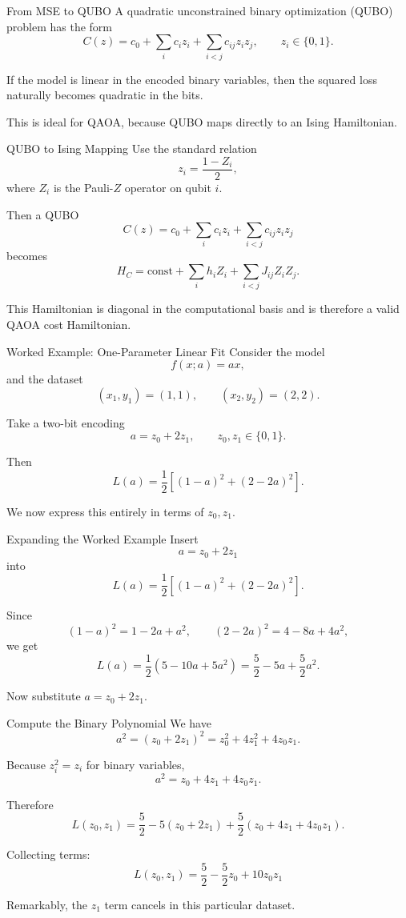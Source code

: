 \documentclass{beamer}
\begin{document}
\begin{frame}{From MSE to QUBO}
A quadratic unconstrained binary optimization (QUBO) problem has the form
\[
C(z)=c_0+\sum_i c_i z_i+\sum_{i<j} c_{ij} z_i z_j,
\qquad z_i\in\{0,1\}.
\]

If the model is linear in the encoded binary variables, then the squared loss naturally becomes quadratic in the bits.

This is ideal for QAOA, because QUBO maps directly to an Ising Hamiltonian.
\end{frame}

\begin{frame}{QUBO to Ising Mapping}
Use the standard relation
\[
z_i=\frac{1-Z_i}{2},
\]
where \(Z_i\) is the Pauli-\(Z\) operator on qubit \(i\).

Then a QUBO
\[
C(z)=c_0+\sum_i c_i z_i+\sum_{i<j} c_{ij} z_i z_j
\]
becomes
\[
H_C = \text{const} + \sum_i h_i Z_i + \sum_{i<j} J_{ij} Z_i Z_j.
\]

This Hamiltonian is diagonal in the computational basis and is therefore a valid QAOA cost Hamiltonian.
\end{frame}

\begin{frame}{Worked Example: One-Parameter Linear Fit}
Consider the model
\[
f(x;a)=ax,
\]
and the dataset
\[
(x_1,y_1)=(1,1), \qquad (x_2,y_2)=(2,2).
\]

Take a two-bit encoding
\[
a=z_0+2z_1,
\qquad z_0,z_1\in\{0,1\}.
\]

Then
\[
L(a)=\frac12\left[(1-a)^2 + (2-2a)^2\right].
\]

We now express this entirely in terms of \(z_0,z_1\).
\end{frame}

\begin{frame}{Expanding the Worked Example}
Insert
\[
a=z_0+2z_1
\]
into
\[
L(a)=\frac12\left[(1-a)^2+(2-2a)^2\right].
\]

Since
\[
(1-a)^2 = 1 - 2a + a^2,
\qquad
(2-2a)^2 = 4 - 8a + 4a^2,
\]
we get
\[
L(a)=\frac12\left(5 - 10a + 5a^2\right)
=
\frac52 - 5a + \frac52 a^2.
\]

Now substitute \(a=z_0+2z_1\).
\end{frame}

\begin{frame}{Compute the Binary Polynomial}
We have
\[
a^2 = (z_0+2z_1)^2 = z_0^2 + 4z_1^2 + 4z_0z_1.
\]

Because \(z_i^2=z_i\) for binary variables,
\[
a^2 = z_0 + 4z_1 + 4z_0z_1.
\]

Therefore
\[
L(z_0,z_1)
=
\frac52 - 5(z_0+2z_1) + \frac52(z_0+4z_1+4z_0z_1).
\]

Collecting terms:
\[
\boxed{
L(z_0,z_1)=\frac52 - \frac52 z_0 + 10 z_0z_1
}
\]

Remarkably, the \(z_1\) term cancels in this particular dataset.
\end{frame}
\end{document}
